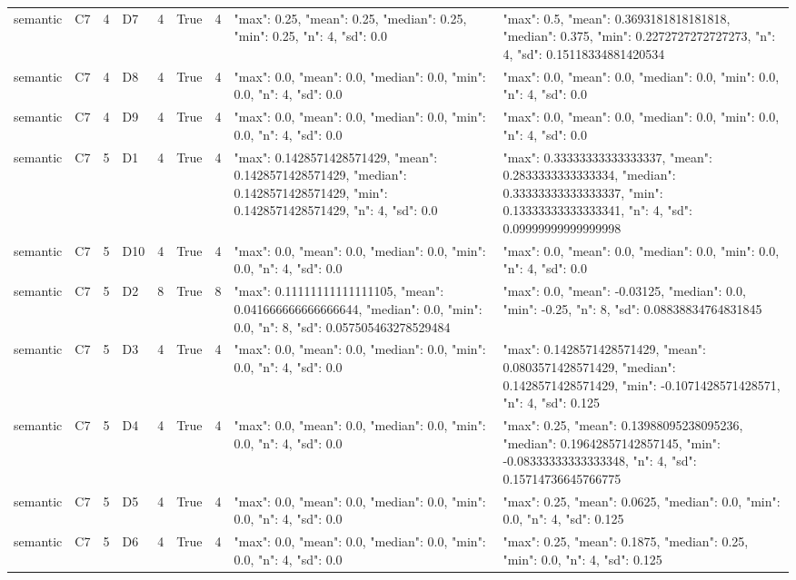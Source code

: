 \begin{tabular}{lllllllll}
semantic & C7 & 4 & D7 & 4 & True & 4 & {"max": 0.25, "mean": 0.25, "median": 0.25, "min": 0.25, "n": 4, "sd": 0.0} & {"max": 0.5, "mean": 0.3693181818181818, "median": 0.375, "min": 0.2272727272727273, "n": 4, "sd": 0.15118334881420534} \\
semantic & C7 & 4 & D8 & 4 & True & 4 & {"max": 0.0, "mean": 0.0, "median": 0.0, "min": 0.0, "n": 4, "sd": 0.0} & {"max": 0.0, "mean": 0.0, "median": 0.0, "min": 0.0, "n": 4, "sd": 0.0} \\
semantic & C7 & 4 & D9 & 4 & True & 4 & {"max": 0.0, "mean": 0.0, "median": 0.0, "min": 0.0, "n": 4, "sd": 0.0} & {"max": 0.0, "mean": 0.0, "median": 0.0, "min": 0.0, "n": 4, "sd": 0.0} \\
semantic & C7 & 5 & D1 & 4 & True & 4 & {"max": 0.1428571428571429, "mean": 0.1428571428571429, "median": 0.1428571428571429, "min": 0.1428571428571429, "n": 4, "sd": 0.0} & {"max": 0.33333333333333337, "mean": 0.2833333333333334, "median": 0.33333333333333337, "min": 0.13333333333333341, "n": 4, "sd": 0.09999999999999998} \\
semantic & C7 & 5 & D10 & 4 & True & 4 & {"max": 0.0, "mean": 0.0, "median": 0.0, "min": 0.0, "n": 4, "sd": 0.0} & {"max": 0.0, "mean": 0.0, "median": 0.0, "min": 0.0, "n": 4, "sd": 0.0} \\
semantic & C7 & 5 & D2 & 8 & True & 8 & {"max": 0.11111111111111105, "mean": 0.041666666666666644, "median": 0.0, "min": 0.0, "n": 8, "sd": 0.057505463278529484} & {"max": 0.0, "mean": -0.03125, "median": 0.0, "min": -0.25, "n": 8, "sd": 0.08838834764831845} \\
semantic & C7 & 5 & D3 & 4 & True & 4 & {"max": 0.0, "mean": 0.0, "median": 0.0, "min": 0.0, "n": 4, "sd": 0.0} & {"max": 0.1428571428571429, "mean": 0.0803571428571429, "median": 0.1428571428571429, "min": -0.1071428571428571, "n": 4, "sd": 0.125} \\
semantic & C7 & 5 & D4 & 4 & True & 4 & {"max": 0.0, "mean": 0.0, "median": 0.0, "min": 0.0, "n": 4, "sd": 0.0} & {"max": 0.25, "mean": 0.13988095238095236, "median": 0.19642857142857145, "min": -0.08333333333333348, "n": 4, "sd": 0.15714736645766775} \\
semantic & C7 & 5 & D5 & 4 & True & 4 & {"max": 0.0, "mean": 0.0, "median": 0.0, "min": 0.0, "n": 4, "sd": 0.0} & {"max": 0.25, "mean": 0.0625, "median": 0.0, "min": 0.0, "n": 4, "sd": 0.125} \\
semantic & C7 & 5 & D6 & 4 & True & 4 & {"max": 0.0, "mean": 0.0, "median": 0.0, "min": 0.0, "n": 4, "sd": 0.0} & {"max": 0.25, "mean": 0.1875, "median": 0.25, "min": 0.0, "n": 4, "sd": 0.125} \\

\end{tabular}
